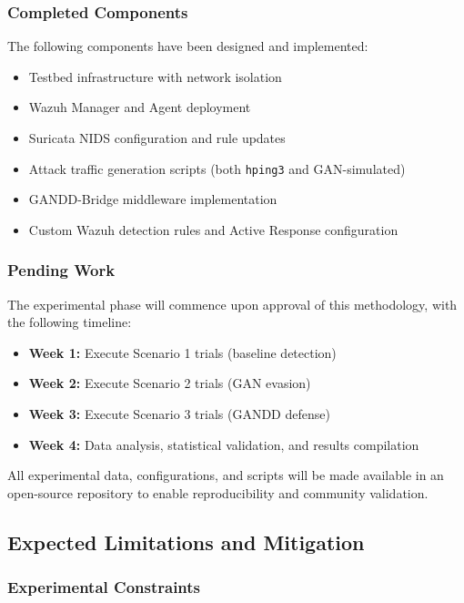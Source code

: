 \subsubsection{Completed Components}

The following components have been designed and implemented:

\begin{itemize}
    \item Testbed infrastructure with network isolation
    \item Wazuh Manager and Agent deployment
    \item Suricata NIDS configuration and rule updates
    \item Attack traffic generation scripts (both \texttt{hping3} and GAN-simulated)
    \item GANDD-Bridge middleware implementation
    \item Custom Wazuh detection rules and Active Response configuration
\end{itemize}

\subsubsection{Pending Work}

The experimental phase will commence upon approval of this methodology, with the following timeline:

\begin{itemize}
    \item \textbf{Week 1:} Execute Scenario 1 trials (baseline detection)
    \item \textbf{Week 2:} Execute Scenario 2 trials (GAN evasion)
    \item \textbf{Week 3:} Execute Scenario 3 trials (GANDD defense)
    \item \textbf{Week 4:} Data analysis, statistical validation, and results compilation
\end{itemize}

All experimental data, configurations, and scripts will be made available in an open-source repository to enable reproducibility and community validation.

\subsection{Expected Limitations and Mitigation}

\subsubsection{Experimental Constraints}

